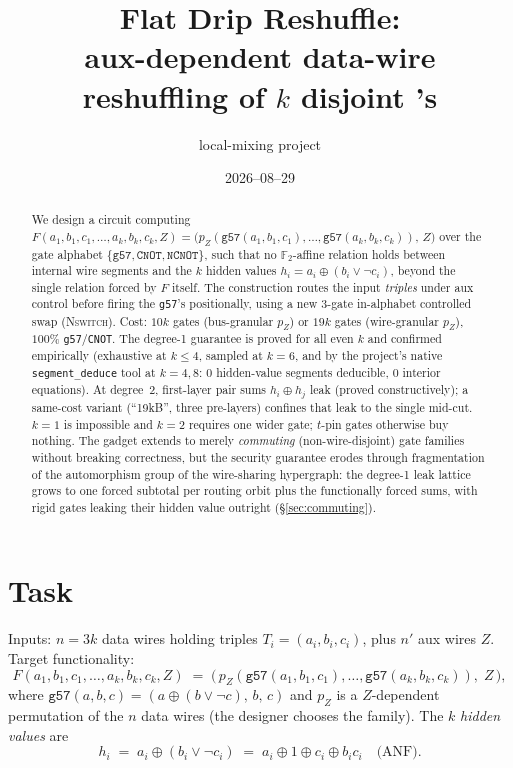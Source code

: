 \documentclass[11pt]{article}
\title{Flat Drip Reshuffle:\\ aux-dependent data-wire reshuffling of $k$ disjoint \g's}
\author{local-mixing project}
\date{2026--08--29}
\theoremstyle{remark}
\newcommand{\g}{\texttt{g57}}
\newcommand{\CNOT}{\texttt{CNOT}}
\newcommand{\NCNOT}{\texttt{NCNOT}}
\newcommand{\NSW}{\textsc{Nswitch}}
\newcommand{\F}{\mathbb{F}_2}
\begin{document}
\maketitle

\begin{abstract}
We design a circuit computing
$F(a_1,b_1,c_1,\dots,a_k,b_k,c_k,Z)=\bigl(p_Z(\g(a_1,b_1,c_1),\dots,\g(a_k,b_k,c_k)),\,Z\bigr)$
over the gate alphabet $\{\g,\CNOT,\NCNOT\}$, such that no $\F$-affine relation holds between
internal wire segments and the $k$ hidden values $h_i=a_i\oplus(b_i\vee\neg c_i)$, beyond the
single relation forced by $F$ itself. The construction routes the input \emph{triples} under aux
control before firing the \g's positionally, using a new 3-gate in-alphabet controlled swap
(\NSW). Cost: $10k$ gates (bus-granular $p_Z$) or $19k$ gates (wire-granular $p_Z$), $100\%$
\g/\CNOT. The degree-1 guarantee is proved for all even $k$ and confirmed empirically
(exhaustive at $k\le4$, sampled at $k=6$, and by the project's native \texttt{segment\_deduce}
tool at $k=4,8$: $0$ hidden-value segments deducible, $0$ interior equations). At degree~2,
first-layer pair sums $h_i\oplus h_j$ leak (proved constructively); a same-cost variant
(``19kB'', three pre-layers) confines that leak to the single mid-cut. $k=1$ is impossible and
$k=2$ requires one wider gate; $t$-pin gates otherwise buy nothing. The gadget extends to
merely \emph{commuting} (non-wire-disjoint) gate families without breaking correctness, but the
security guarantee erodes through fragmentation of the automorphism group of the wire-sharing
hypergraph: the degree-1 leak lattice grows to one forced subtotal per routing orbit plus the
functionally forced sums, with rigid gates leaking their hidden value outright
(\S\ref{sec:commuting}).
\end{abstract}

\section{Task}

Inputs: $n=3k$ data wires holding triples $T_i=(a_i,b_i,c_i)$, plus $n'$ aux wires $Z$.
Target functionality:
\[
F(a_1,b_1,c_1,\dots,a_k,b_k,c_k,Z)\;=\;\bigl(\,p_Z(\g(a_1,b_1,c_1),\dots,\g(a_k,b_k,c_k)),\;Z\,\bigr),
\]
where $\g(a,b,c)=(a\oplus(b\vee\neg c),\,b,\,c)$ and $p_Z$ is a $Z$-dependent permutation of the
$n$ data wires (the designer chooses the family). The $k$ \emph{hidden values} are
\[
h_i \;=\; a_i\oplus(b_i\vee\neg c_i) \;=\; a_i\oplus 1\oplus c_i\oplus b_ic_i \quad\text{(ANF)}.
\]
\end{document}
